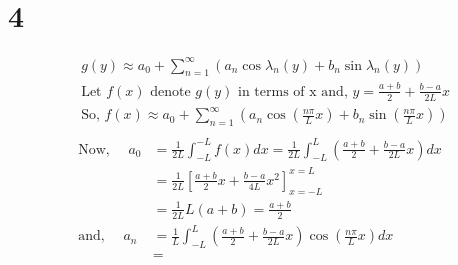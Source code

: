 \documentclass[letterpaper,12pt,titlepage,oneside,final]{book}
\begin{document}
\section*{4}
\begin{align*}
&g(y) \approx a_0 + \sum_{n=1}^{\infty}\left(a_n \cos\lambda_n(y) + b_n \sin \lambda_n (y)\right)\\
&\text{Let $f(x)$ denote $g(y)$ in terms of x and, } y = \frac{a+b}{2} + \frac{b-a}{2L}x\\
&\text{So, }f(x)\approx  a_0 + \sum_{n=1}^{\infty}\left(a_n \cos\left(\frac{n\pi}{L}x\right) + b_n \sin \left(\frac{n\pi}{L}x\right) \right)\\
\end{align*}
\begin{align*}
\text{Now, }\quad a_0 &= \frac{1}{2L}\int_{-L}^{-L}f(x)dx = \frac{1}{2L}\int_{-L}^{L}\left(\frac{a+b}{2} + \frac{b-a}{2L}x\right)dx\\
& = \frac{1}{2L} \left[\frac{a+b}{2}x + \frac{b-a}{4L}x^2\right]_{x=-L}^{x=L}\\
& = \frac{1}{2L}L(a+b) = \frac{a+b}{2}
\\
\text{and, }\quad a_n &= \frac{1}{L}\int_{-L}^{L}\left(\frac{a+b}{2}+\frac{b-a}{2L}x\right)\cos\left(\frac{n\pi}{L}x\right)dx\\
& = 
\end{align*}
\cleardoublepage
\end{document}
